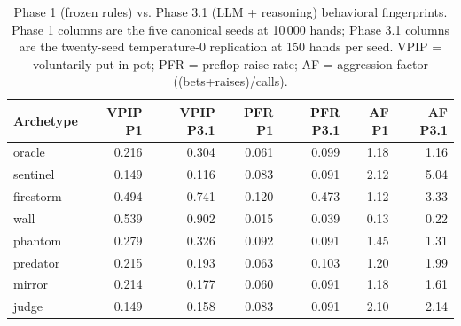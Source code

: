 \begin{table}[ht]
\centering
\small
\begin{tabular}{lrrrrrr}
\hline
Archetype & VPIP P1 & VPIP P3.1 & PFR P1 & PFR P3.1 & AF P1 & AF P3.1 \\
\hline
oracle & 0.216 & 0.304 & 0.061 & 0.099 & 1.18 & 1.16 \\
sentinel & 0.149 & 0.116 & 0.083 & 0.091 & 2.12 & 5.04 \\
firestorm & 0.494 & 0.741 & 0.120 & 0.473 & 1.12 & 3.33 \\
wall & 0.539 & 0.902 & 0.015 & 0.039 & 0.13 & 0.22 \\
phantom & 0.279 & 0.326 & 0.092 & 0.091 & 1.45 & 1.31 \\
predator & 0.215 & 0.193 & 0.063 & 0.103 & 1.20 & 1.99 \\
mirror & 0.214 & 0.177 & 0.060 & 0.091 & 1.18 & 1.61 \\
judge & 0.149 & 0.158 & 0.083 & 0.091 & 2.10 & 2.14 \\
\hline
\end{tabular}
\caption{Phase 1 (frozen rules) vs. Phase 3.1 (LLM + reasoning) behavioral fingerprints. Phase 1 columns are the five canonical seeds at 10\,000 hands; Phase 3.1 columns are the twenty-seed temperature-0 replication at 150 hands per seed. VPIP = voluntarily put in pot; PFR = preflop raise rate; AF = aggression factor ((bets+raises)/calls).}
\label{tab:behavioral-shift}
\end{table}
